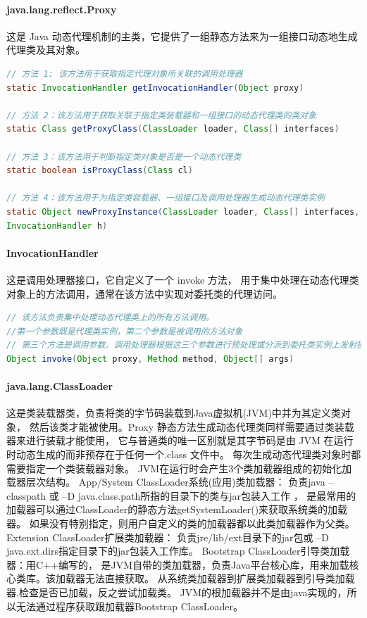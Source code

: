 \documentclass{book}
\begin{document}
\paragraph{java.lang.reflect.Proxy}

这是 Java 动态代理机制的主类，它提供了一组静态方法来为一组接口动态地生成代理类及其对象。

\begin{lstlisting}[language=Java]
// 方法 1: 该方法用于获取指定代理对象所关联的调用处理器
static InvocationHandler getInvocationHandler(Object proxy) 

// 方法 2：该方法用于获取关联于指定类装载器和一组接口的动态代理类的类对象
static Class getProxyClass(ClassLoader loader, Class[] interfaces) 

// 方法 3：该方法用于判断指定类对象是否是一个动态代理类
static boolean isProxyClass(Class cl) 

// 方法 4：该方法用于为指定类装载器、一组接口及调用处理器生成动态代理类实例
static Object newProxyInstance(ClassLoader loader, Class[] interfaces, 
InvocationHandler h)
\end{lstlisting}

\paragraph{InvocationHandler}

这是调用处理器接口，它自定义了一个 invoke 方法，
用于集中处理在动态代理类对象上的方法调用，通常在该方法中实现对委托类的代理访问。

\begin{lstlisting}[language=Java]
// 该方法负责集中处理动态代理类上的所有方法调用。
//第一个参数既是代理类实例，第二个参数是被调用的方法对象
// 第三个方法是调用参数。调用处理器根据这三个参数进行预处理或分派到委托类实例上发射执行
Object invoke(Object proxy, Method method, Object[] args)
\end{lstlisting}

\paragraph{java.lang.ClassLoader}

这是类装载器类，负责将类的字节码装载到Java虚拟机(JVM)中并为其定义类对象，
然后该类才能被使用。Proxy 静态方法生成动态代理类同样需要通过类装载器来进行装载才能使用，
它与普通类的唯一区别就是其字节码是由 JVM 在运行时动态生成的而非预存在于任何一个.class 文件中。
每次生成动态代理类对象时都需要指定一个类装载器对象。
JVM在运行时会产生3个类加载器组成的初始化加载器层次结构。
App/System ClassLoader系统(应用)类加载器：
负责java –classpath 或 –D java.class.path所指的目录下的类与jar包装入工作 ，
是最常用的加载器可以通过ClassLoader的静态方法getSystemLoader()来获取系统类的加载器。
如果没有特别指定，则用户自定义的类的加载器都以此类加载器作为父类。
Extension ClassLoader扩展类加载器：
负责jre/lib/ext目录下的jar包或 –D java.ext.dirs指定目录下的jar包装入工作库。
Bootstrap ClassLoader引导类加载器：用C++编写的，
是JVM自带的类加载器，负责Java平台核心库，用来加载核心类库。该加载器无法直接获取。
从系统类加载器到扩展类加载器到引导类加载器,检查是否已加载，反之尝试加载类。
JVM的根加载器并不是由java实现的，所以无法通过程序获取跟加载器Bootstrap ClassLoader。
\end{document}
